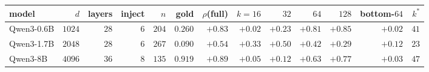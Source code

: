 \begin{tabular}{@{}lrrrrrrrrrrrr@{}}
\toprule
\rowcolor{TableHeader}
model & $d$ & layers & inject & $n$ & gold & $\rho$(full) & $k{=}16$ & $32$ & $64$ & $128$ & bottom-$64$ & $k^{*}$ \\
\midrule
Qwen3-0.6B & $1024$ & $28$ & $6$ & $204$ & $0.260$ & $+0.83$ & $+0.02$ & $+0.23$ & $+0.81$ & $+0.85$ & $+0.02$ & $41$ \\
Qwen3-1.7B & $2048$ & $28$ & $6$ & $267$ & $0.090$ & $+0.54$ & $+0.33$ & $+0.50$ & $+0.42$ & $+0.29$ & $+0.12$ & $23$ \\
Qwen3-8B & $4096$ & $36$ & $8$ & $135$ & $0.919$ & $+0.89$ & $+0.05$ & $+0.12$ & $+0.63$ & $+0.77$ & $+0.03$ & $47$ \\
\bottomrule
\end{tabular}
